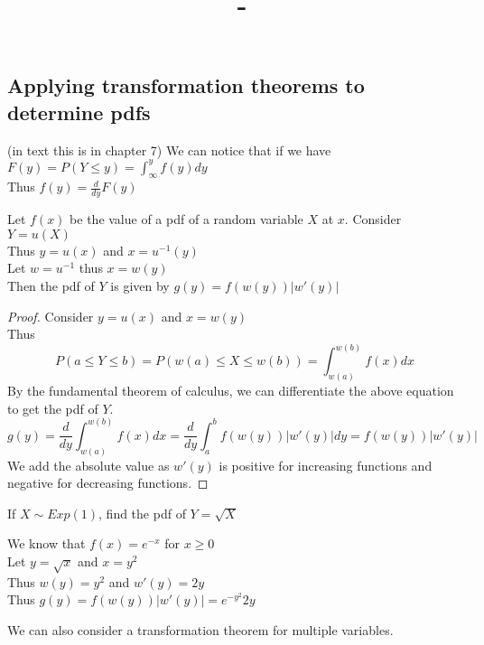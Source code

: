\documentclass[answers,12pt,addpoints]{exam}
\author{\name}
\title{\course \ - \assignment}
\begin{document}
\maketitle


\newpage
\subsection*{Applying transformation theorems to determine pdfs}
(in text this is in chapter 7)
We can notice that if we have $F(y) = P(Y \leq y) = \int_{\infty}^{y} f(y) dy$ \\
Thus $f(y) = \frac{d}{dy} F(y)$\\
\begin{theorem}
    Let $f(x)$ be the value of a pdf of a random variable $X$ at $x$. Consider $Y = u(X)$ \\
    Thus $y = u(x)$ and $x = u^{-1}(y)$\\
    Let $w = u^{-1}$ thus $x = w(y)$\\
    Then the pdf of $Y$ is given by $g(y) = f(w(y)) |w'(y)|$
    \begin{proof}
        Consider $y = u(x)$ and $x = w(y)$\\
        Thus 
        $$ P(a \leq Y \leq b) = P(w(a) \leq X \leq w(b)) = \int_{w(a)}^{w(b)} f(x) dx$$
        By the fundamental theorem of calculus, we can differentiate the above equation to get the pdf of $Y$.
        $$ g(y) = \frac{d}{dy} \int_{w(a)}^{w(b)} f(x) dx = \frac{d}{dy} \int_a^b f(w(y)) |w'(y)| dy = f(w(y)) |w'(y)|$$
        We add the absolute value as $w'(y)$ is positive for increasing functions and negative for decreasing functions.
    \end{proof}
\end{theorem}
\begin{example}
    If $X \sim Exp(1)$, find the pdf of $Y = \sqrt{X}$
    \begin{solution}
        We know that $f(x) = e^{-x}$ for $x \geq 0$\\
        Let $y = \sqrt{x}$ and $x = y^2$\\
        Thus $w(y) = y^2$ and $w'(y) = 2y$\\
        Thus $g(y) = f(w(y)) |w'(y)| = e^{-y^2} 2y$
    \end{solution}
\end{example}
We can also consider a transformation theorem for multiple variables.\\
\end{document}
